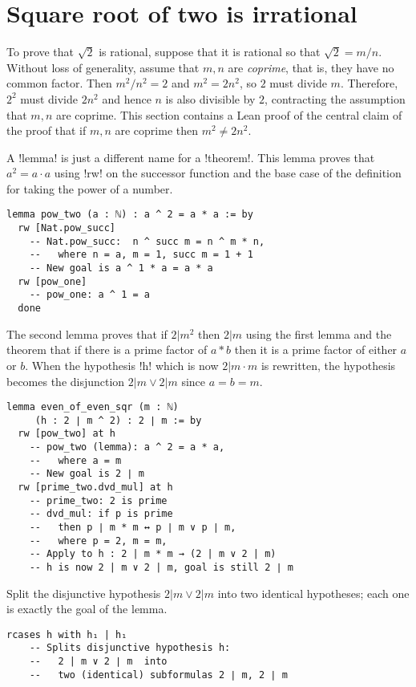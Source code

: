 
\section{Square root of two is irrational}

To prove that $\sqrt{2}$ is rational, suppose that it is rational so that $\sqrt{2}=m/n$. Without loss of generality, assume that $m,n$ are \emph{coprime}, that is, they have no common factor. Then $m^2/n^2=2$ and $m^2=2n^2$, so $2$ must divide $m$. Therefore, $2^2$ must divide $2n^2$ and hence $n$ is also divisible by $2$, contracting the assumption that $m,n$ are coprime. This section contains a Lean proof of the central claim of the proof that if $m,n$ are coprime then $m^2\neq 2n^2$.

A !lemma! is just a different name for a !theorem!. This lemma proves that $a^2=a\cdot a$ using !rw! on the successor function and the base case of the definition for taking the power of a number.
\begin{Verbatim}
lemma pow_two (a : ℕ) : a ^ 2 = a * a := by
  rw [Nat.pow_succ]
    -- Nat.pow_succ:  n ^ succ m = n ^ m * n,
    --   where n = a, m = 1, succ m = 1 + 1
    -- New goal is a ^ 1 * a = a * a
  rw [pow_one]
    -- pow_one: a ^ 1 = a
  done
\end{Verbatim}

The second lemma proves that if $2 | m^2$ then $2 | m$ using the first lemma and the theorem that if there is a prime factor of $a*b$ then it is a prime factor of either $a$ or $b$. When the hypothesis !h! which is now $2| m \cdot m$ is rewritten, the hypothesis becomes the disjunction $2 | m \vee 2 | m$ since $a=b=m$.
\begin{Verbatim}[firstnumber=last]
lemma even_of_even_sqr (m : ℕ)
     (h : 2 ∣ m ^ 2) : 2 ∣ m := by
  rw [pow_two] at h
    -- pow_two (lemma): a ^ 2 = a * a,
    --   where a = m
    -- New goal is 2 ∣ m
  rw [prime_two.dvd_mul] at h
    -- prime_two: 2 is prime
    -- dvd_mul: if p is prime 
    --   then p ∣ m * m ↔ p ∣ m ∨ p ∣ m,
    --   where p = 2, m = m,
    -- Apply to h : 2 | m * m → (2 | m ∨ 2 | m)
    -- h is now 2 | m ∨ 2 | m, goal is still 2 ∣ m
\end{Verbatim}

Split the disjunctive hypothesis $2 | m \vee 2 | m$ into two identical hypotheses; each one is exactly the goal of the lemma.

\begin{Verbatim}[firstnumber=last]
  rcases h with h₁ | h₁
    -- Splits disjunctive hypothesis h: 
    --   2 | m ∨ 2 ∣ m  into
    --   two (identical) subformulas 2 ∣ m, 2 ∣ m
\end{Verbatim}

